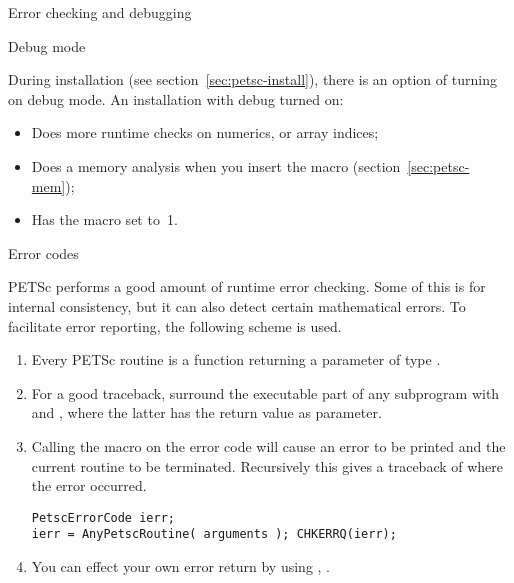
 {Error checking and debugging}

 {Debug mode}
\label{sec:petsc-debug-mode}

During installation (see section~\ref{sec:petsc-install}),
there is an option of turning on debug mode.
An installation with debug turned on:
\begin{itemize}
\item Does more runtime checks on numerics, or array indices;
\item Does a memory analysis when you insert the  macro
  (section~\ref{sec:petsc-mem});
\item Has the macro  set to~1.
\end{itemize}

 {Error codes}
\label{sec:petsc-error}

PETSc performs a good amount of runtime error checking. Some of this
is for internal consistency, but it can also detect certain
mathematical errors. To facilitate error reporting, the following
scheme is used.
\begin{enumerate}
\item Every PETSc routine is a function returning a parameter of type
  .
\item For a good traceback, surround the executable part of any subprogram
  with  and ,
  where the latter has the return value as parameter.
\item Calling the macro  on the error code will
  cause an error to be printed and the current routine to be
  terminated. Recursively this gives a traceback of where the error
  occurred.
\begin{lstlisting}
PetscErrorCode ierr;
ierr = AnyPetscRoutine( arguments ); CHKERRQ(ierr);
\end{lstlisting}

\item You can effect your own error return by using
  ,
  .
\end{enumerate}

